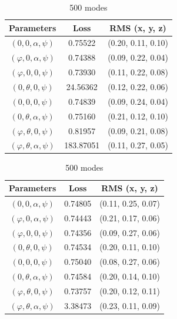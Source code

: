 \documentclass[a4paper,12pt]{article}
\theoremstyle{definition}
\begin{document}
\begin{table}[!htb]
    \caption{Losses obtain for different parameter combination}
    \begin{subtable}{.5\linewidth}
      \centering
        \caption{250 modes}
        \begin{tabular}{ c | c | c}
        Parameters & Loss & RMS (x, y, z)\\
        \hline
        $(0,0,\alpha,\psi)$ & 0.75522 & (0.20, 0.11, 0.10)\\
        $(\varphi,0, \alpha,\psi)$ & 0.74388 & (0.09, 0.22, 0.04)\\
        $(\varphi, 0,0,\psi)$ & 0.73930 & (0.11, 0.22, 0.08)\\
        $(0, \theta, 0,\psi)$ & 24.56362 & (0.12, 0.22, 0.06)\\
        $(0, 0, 0,\psi)$ & 0.74839 & (0.09, 0.24, 0.04)\\
        $(0,\theta, \alpha,\psi)$ & 0.75160 & (0.21, 0.12, 0.10)\\
        $(\varphi,\theta,0,\psi)$ & 0.81957 & (0.09, 0.21, 0.08)\\
        $(\varphi,\theta,\alpha,\psi)$ & 183.87051 & (0.11, 0.27, 0.05)\\
        \end{tabular}
    \end{subtable}%
    \begin{subtable}{.5\linewidth}
      \centering
        \caption{500 modes}
        \begin{tabular}{ c | c | c}
        Parameters & Loss & RMS (x, y, z)\\
        \hline
        $(0,0,\alpha,\psi)$ & 0.74805 & (0.11, 0.25, 0.07)\\
        $(\varphi,0, \alpha,\psi)$ & 0.74443 & (0.21, 0.17, 0.06)\\
        $(\varphi, 0,0,\psi)$ & 0.74356 & (0.09, 0.27, 0.06)\\
        $(0, \theta, 0,\psi)$ & 0.74534 & (0.20, 0.11, 0.10)\\
        $(0, 0, 0,\psi)$ & 0.75040 & (0.08, 0.27, 0.06)\\
        $(0,\theta, \alpha,\psi)$ & 0.74584 & (0.20, 0.14, 0.10)\\
        $(\varphi,\theta,0,\psi)$ & 0.73757 & (0.20, 0.12, 0.11)\\
        $(\varphi,\theta,\alpha,\psi)$ &  3.38473  & (0.23, 0.11, 0.09)\\
        \end{tabular}
    \end{subtable}
\end{table}
\end{document}
